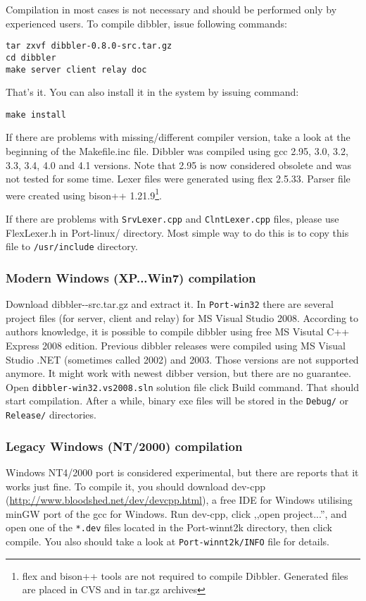 Compilation in most cases is not necessary and should be performed
only by experienced users. To compile dibbler, issue following commands:
\begin{lstlisting}
tar zxvf dibbler-0.8.0-src.tar.gz
cd dibbler
make server client relay doc
\end{lstlisting}

That's it. You can also install it in the system by issuing command:

\begin{lstlisting}
make install
\end{lstlisting}

If there are problems with missing/different compiler
version, take a look at the beginning of the Makefile.inc
file. Dibbler was compiled using gcc 2.95, 3.0, 3.2, 3.3, 3.4, 4.0 and 4.1
versions. Note that 2.95 is now considered obsolete and was not tested
for some time. Lexer files were generated using flex 2.5.33. Parser file
were created using bison++ 1.21.9\footnote{flex and bison++ tools are
  not required to compile Dibbler. Generated files are placed in CVS
  and in tar.gz archives}.

If there are problems with \verb+SrvLexer.cpp+ and
\verb+ClntLexer.cpp+ files, please use FlexLexer.h in Port-linux/
directory. Most simple way to do this is to copy this file to
\verb+/usr/include+ directory.

\subsubsection{Modern Windows (XP...Win7) compilation}
Download dibbler-\version-src.tar.gz and extract it. In
\verb+Port-win32+ there are several project files (for server, client
and relay) for MS Visual Studio 2008. According to authors knowledge,
it is possible to compile dibbler using free MS Visutal C++ Express
2008 edition. Previous dibbler releases were compiled using MS Visual
Studio .NET (sometimes called 2002) and 2003. Those versions are not
supported anymore. It might work with newest dibber version, but there
are no guarantee. Open \verb+dibbler-win32.vs2008.sln+ solution file
click Build command. That should start compilation. After a while,
binary exe files will be stored in the \verb+Debug/+ or
\verb+Release/+ directories.

\subsubsection{Legacy Windows (NT/2000) compilation}
Windows NT4/2000 port is considered experimental, but there are reports
that it works just fine. To compile it, you should download dev-cpp
(\url{http://www.bloodshed.net/dev/devcpp.html}), a free IDE for
Windows utilising minGW port of the gcc for Windows. Run dev-cpp,
click ,,open project...'', and open one of the \verb+*.dev+ files located
in the Port-winnt2k directory, then click compile. You also should
take a look at \verb+Port-winnt2k/INFO+ file for details.


